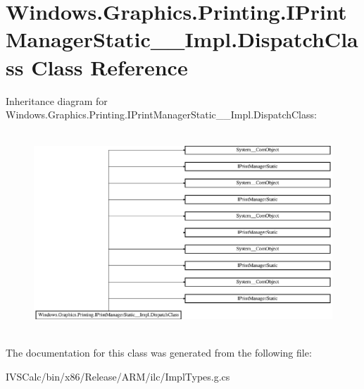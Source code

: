 \hypertarget{class_windows_1_1_graphics_1_1_printing_1_1_i_print_manager_static_____impl_1_1_dispatch_class}{}\section{Windows.\+Graphics.\+Printing.\+I\+Print\+Manager\+Static\+\_\+\+\_\+\+Impl.\+Dispatch\+Class Class Reference}
\label{class_windows_1_1_graphics_1_1_printing_1_1_i_print_manager_static_____impl_1_1_dispatch_class}
Inheritance diagram for Windows.\+Graphics.\+Printing.\+I\+Print\+Manager\+Static\+\_\+\+\_\+\+Impl.\+Dispatch\+Class\+:\begin{figure}[H]
\begin{center}
\leavevmode
\includegraphics[height=7.567567cm]{class_windows_1_1_graphics_1_1_printing_1_1_i_print_manager_static_____impl_1_1_dispatch_class}
\end{center}
\end{figure}


The documentation for this class was generated from the following file\+:\begin{DoxyCompactItemize}
\item 
I\+V\+S\+Calc/bin/x86/\+Release/\+A\+R\+M/ilc/Impl\+Types.\+g.\+cs\end{DoxyCompactItemize}
